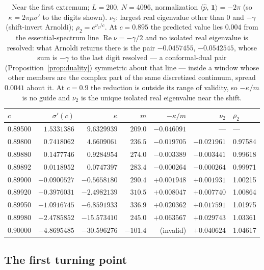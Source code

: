 \documentclass[11pt]{article}
\theoremstyle{plain}
\theoremstyle{definition}
\theoremstyle{remark}
\newcommand{\ip}[2]{\langle #1,\,#2\rangle}
\newcommand{\ph}{\hat p}
\newcommand{\one}{\mathbf 1}
\begin{document}
\begin{table}[h]
\centering\small
\caption{Near the first extremum; $L=200$, $N=4096$, normalization $\ip{\ph}{\one}=-2\pi$
(so $\kappa=2\pi\mu\sigma'$ to the digits shown). $\nu_2$: largest real eigenvalue other than
$0$ and $-\gamma$ (shift-invert Arnoldi); $\rho_2=e^{\nu_2/c}$. At $c=0.895$ the predicted
value lies $0.004$ from the essential-spectrum line $\operatorname{Re}\nu=-\gamma/2$ and no
isolated real eigenvalue is resolved: what Arnoldi returns there is the pair $-0.0457455$,
$-0.0542545$, whose sum is $-\gamma$ to the last digit resolved --- a conformal-dual pair
(Proposition~\ref{prop:duality}) symmetric about that line --- inside a window whose other
members are the complex part of the same discretized continuum, spread $0.0041$ about it. At
$c=0.9$ the reduction is outside its range of validity, so $-\kappa/m$ is no guide and
$\nu_2$ is the unique isolated real eigenvalue near the shift.}
\label{tab:threshold}
\begin{tabular}{@{}lrrrrrl@{}}
\toprule
$c$ & $\sigma'(c)$ & $\kappa$ & $m$ & $-\kappa/m$ & $\nu_2$ & $\rho_2$\\
\midrule
0.89500 & $ 1.5331386$ & $  9.6329939$ & $209.0$ & $-0.046091$ & ---         & ---\\
0.89800 & $ 0.7418062$ & $  4.6609061$ & $236.5$ & $-0.019705$ & $-0.021961$ & 0.97584\\
0.89880 & $ 0.1477746$ & $  0.9284954$ & $274.0$ & $-0.003389$ & $-0.003441$ & 0.99618\\
0.89892 & $ 0.0118952$ & $  0.0747397$ & $283.4$ & $-0.000264$ & $-0.000264$ & 0.99971\\
0.89900 & $-0.0900527$ & $ -0.5658180$ & $290.4$ & $+0.001948$ & $+0.001931$ & 1.00215\\
0.89920 & $-0.3976031$ & $ -2.4982139$ & $310.5$ & $+0.008047$ & $+0.007740$ & 1.00864\\
0.89950 & $-1.0916745$ & $ -6.8591933$ & $336.9$ & $+0.020362$ & $+0.017591$ & 1.01975\\
0.89980 & $-2.4785852$ & $-15.573410$  & $245.0$ & $+0.063567$ & $+0.029743$ & 1.03361\\
0.90000 & $-4.8695485$ & $-30.596276$  & $-101.4$& (invalid)   & $+0.040624$ & 1.04617\\
\bottomrule
\end{tabular}
\end{table}

\subsection{The first turning point}
\end{document}
